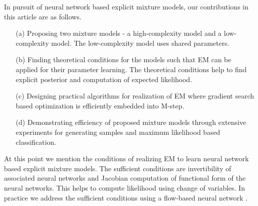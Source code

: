 In pursuit of neural network based explicit mixture models, our contributions in this article are as follows.
\begin{enumerate}
\item[(a)] Proposing two mixture models - a high-complexity model and a low-complexity model. The low-complexity model uses shared parameters.
\item[(b)] Finding theoretical conditions for the models such that EM can be applied for their parameter learning. The theoretical conditions help to find explicit posterior and computation of expected likelihood. 
\item[(c)] Designing practical algorithms for realization of EM where gradient search based optimization is efficiently embedded into M-step.
\item[(d)] Demonstrating efficiency of proposed mixture models through extensive experiments for generating samples and maximum likelihood based classification. 
\end{enumerate}
{At this point we mention the conditions of realizing EM to learn neural network based explicit mixture models.} The sufficient conditions are invertibility of associated neural networks and Jacobian computation of functional form of the neural networks. This helps to compute likelihood using change of variables. In practice we address the sufficient conditions using a flow-based neural network \cite{2018arXiv180703039K}.












